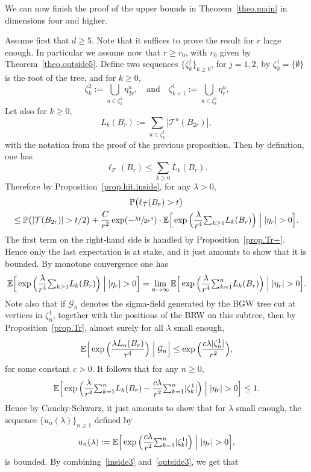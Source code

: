 \documentclass[11pt]{article}
\numberwithin{equation}{section}
\let\ts\textstyle
\theoremstyle{plain}
\theoremstyle{definition}
\newcommand{\1}{{\text{\Large $\mathfrak 1$}}}
\begin{document}
We can now finish the proof of the upper bounds in Theorem~\ref{theo.main}
in dimensions four and higher.

Assume first that $d\ge 5$. Note that it suffices to prove the result for $r$ large enough. In particular we assume now that $r\ge r_0$, with $r_0$ given by Theorem~\ref{theo.outside5}. Define two sequences $\{\zeta_k^j\}_{k\ge 0}$, for $j=1,2$, by $\zeta_0^1 = \{\emptyset\}$ is the root of the tree, and for $k\ge 0$,
\[
\zeta_k^2 := \bigcup_{u\in \zeta_k^1} \eta^u_{2r},
\quad \text{and}\quad \zeta_{k+1}^1 := \bigcup_{u\in \zeta_k^2} \eta^u_r.
\]
Let also for $k\ge 0$,
\[
L_k(B_r) := \sum_{u\in \zeta_k^1} |\mathcal T^u(B_{2r})|,
\]
with the notation from the proof of the previous proposition. Then by definition, one has
\[
\ell_{\mathcal T}(B_r) \le \sum_{k\ge 0} L_k(B_r).
\]
Therefore by Proposition~\ref{prop.hit.inside}, for any $\lambda>0$,
\begin{multline*}
\mathbb P\big(\ell_{\mathcal T}(B_r)>t\big)\\
\le
\mathbb P\big(|\mathcal T(B_{2r})|>t/2\big) +
\frac{C}{r^2}\exp(-\sfrac{\lambda t}{2r^4})\cdot \mathbb E\Big[\exp\Big(\frac{\lambda}{r^4}{\ts\sum_{k\ge 1}} L_k(B_r)\Big)\Bigm||\eta_r|> 0 \Big].
\end{multline*}
The first term on the right-hand side is handled by Proposition~\ref{prop.Tr+}. Hence only the last expectation is at stake, and it just
amounts to show that it is bounded. By monotone convergence one has
\[
\mathbb E\Big[\exp\Big(\frac{\lambda}{r^4}{\ts\sum_{k\ge 1}}L_k(B_r)\Big)\Bigm| |\eta_r|> 0 \Big] = \lim_{n\to \infty} \mathbb E\Big[\exp\Big(\frac{\lambda}{r^4}{\ts\sum_{k=1}^n} L_k(B_r)\Big)\Bigm||\eta_r|> 0 \Big].
\]
Note also that if $\mathcal G_n$ denotes the
sigma-field generated by the BGW tree cut at vertices in $\zeta_n^1$,
together with the positions of the BRW on this subtree, then by Proposition~\ref{prop.Tr}, almost surely for all $\lambda$ small enough,
\[
\mathbb E\Big[\exp\Big(\frac{\lambda L_n(B_r)}{r^4}\Big)\Bigm|\mathcal G_n \Big] \le \exp\Big(\frac{c\lambda |\zeta_n^1|}{r^2}\Big),
\]
for some constant $c>0$. It follows that for any $n\ge 0$,
\[
\mathbb E\Big[\exp\Big(\frac{\lambda}{r^4}{\ts\sum_{k=1}^n} L_k(B_r) - \frac{c\lambda}{r^2}{\ts\sum_{k=1}^n} |\zeta_k^1| \Big)\Bigm||\eta_r|> 0 \Big]\le 1.
\]
Hence by Cauchy-Schwarz, it just amounts to show that for $\lambda$ small enough, the sequence $\{u_n(\lambda)\}_{n\ge 1}$ defined by
\[
u_n(\lambda):=\mathbb E\Big[\exp\Big(\frac{c\lambda}{r^2}{\ts\sum_{k=1}^n} |\zeta_k^1| \Big)\Bigm||\eta_r|> 0 \Big],
\]
is bounded. By combining~\eqref{inside3} and~\eqref{outside3}, we get that
\end{document}
